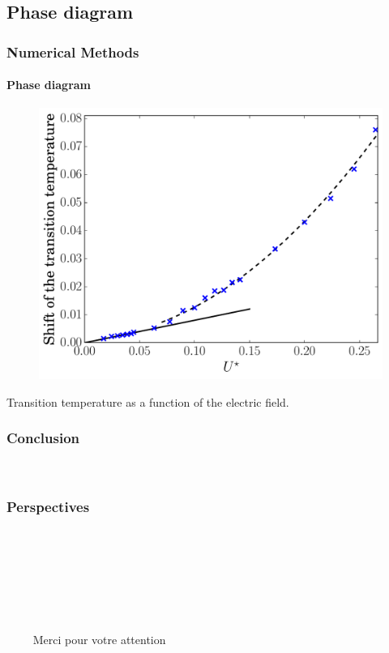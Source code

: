 \documentclass{beamer}
\begin{document}
\subsection{Phase diagram}
\begin{frame}
	\frametitle{Numerical Methods}
	\framesubtitle{Phase diagram}

\begin{figure}
\includegraphics[scale=0.48]{figures/electricField.pdf}
\end{figure}
\vspace{-0.6cm}
\center Transition temperature as a function of the electric field.
\end{frame}


\begin{frame}
	\frametitle{Conclusion}
	\framesubtitle{\ }
	

\end{frame}

\begin{frame}
	\frametitle{Perspectives}
	\framesubtitle{\ }

\end{frame}



\begin{frame}
	\frametitle{\ }
	\framesubtitle{\ }

{\center $\qquad$ \Huge Merci pour votre attention}

\end{frame}






\end{document}
